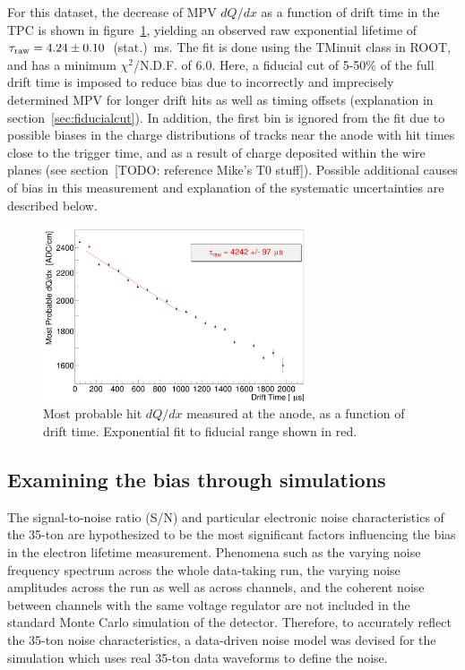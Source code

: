 \documentclass[10pt,a4paper]{article}
\begin{document}
For this dataset, the decrease of MPV $dQ/dx$ as a function of drift time in the TPC is shown in figure~\ref{fig:landMPV}, yielding an observed raw exponential lifetime of $\tau_{\rm{raw}}=4.24\pm0.10$~(stat.)~ms. The fit is done using the TMinuit class in ROOT, and has a minimum $\chi^2$/N.D.F. of 6.0. Here, a fiducial cut of 5-50\% of the full drift time is imposed to reduce bias due to incorrectly and imprecisely determined MPV for longer drift hits as well as timing offsets (explanation in section~\ref{sec:fiducialcut}). In addition, the first bin is ignored from the fit due to possible biases in the charge distributions of tracks near the anode with hit times close to the trigger time, and as a result of charge deposited within the wire planes (see section~[TODO: reference Mike's T0 stuff]). Possible additional causes of bias in this measurement and explanation of the systematic uncertainties are described below.

\begin{figure}
\centering
\includegraphics[width=0.7\textwidth]{canvMPV.png}
\caption{Most probable hit $dQ/dx$ measured at the anode, as a function of drift time. Exponential fit to fiducial range shown in red.}
\label{fig:landMPV}
\end{figure}

\subsection{Examining the bias through simulations}\label{sec:lifetimebias}

The signal-to-noise ratio (S/N) and particular electronic noise characteristics of the 35-ton are hypothesized to be the most significant factors influencing the bias in the electron lifetime measurement. Phenomena such as the varying noise frequency spectrum across the whole data-taking run, the varying noise amplitudes across the run as well as across channels, and the coherent noise between channels with the same voltage regulator are not included in the standard Monte Carlo simulation of the detector. Therefore, to accurately reflect the 35-ton noise characteristics, a data-driven noise model was devised for the simulation which uses real 35-ton data waveforms to define the noise.
\end{document}
